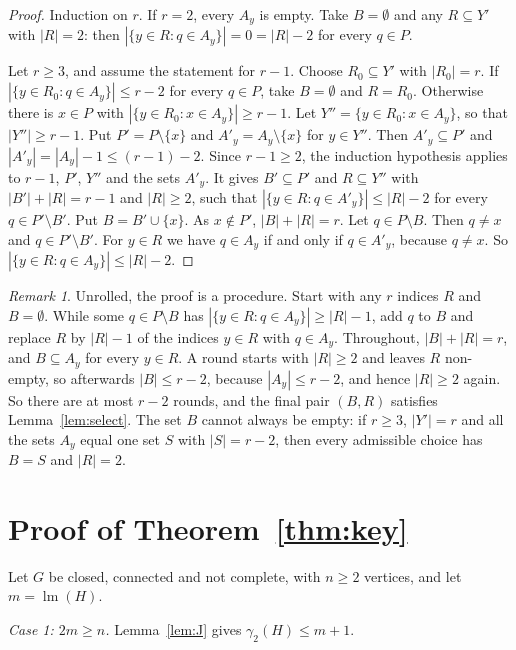 \documentclass[11pt,a4paper]{article}
\theoremstyle{remark}
\newtheorem{remark}[theorem]{Remark}
\newcommand{\lm}{\operatorname{lm}}
\begin{document}
\begin{proof}
Induction on $r$. If $r=2$, every $A_y$ is empty. Take $B=\emptyset$ and any $R\subseteq Y'$
with $|R|=2$: then $|\{y\in R: q\in A_y\}|=0=|R|-2$ for every $q\in P$.

Let $r\ge 3$, and assume the statement for $r-1$. Choose $R_0\subseteq Y'$ with $|R_0|=r$. If
$|\{y\in R_0: q\in A_y\}|\le r-2$ for every $q\in P$, take $B=\emptyset$ and $R=R_0$.
Otherwise there is $x\in P$ with $|\{y\in R_0: x\in A_y\}|\ge r-1$. Let
$Y''=\{y\in R_0: x\in A_y\}$, so that $|Y''|\ge r-1$. Put $P'=P\setminus\{x\}$ and
$A'_y=A_y\setminus\{x\}$ for $y\in Y''$. Then $A'_y\subseteq P'$ and
$|A'_y|=|A_y|-1\le(r-1)-2$. Since $r-1\ge 2$, the induction hypothesis applies to
$r-1$, $P'$, $Y''$ and the sets $A'_y$. It gives $B'\subseteq P'$ and $R\subseteq Y''$ with
$|B'|+|R|=r-1$ and $|R|\ge 2$, such that $|\{y\in R: q\in A'_y\}|\le|R|-2$ for every
$q\in P'\setminus B'$. Put $B=B'\cup\{x\}$. As $x\notin P'$, $|B|+|R|=r$. Let
$q\in P\setminus B$. Then $q\neq x$ and $q\in P'\setminus B'$. For $y\in R$ we have $q\in A_y$ if
and only if $q\in A'_y$, because $q\ne x$. So $|\{y\in R: q\in A_y\}|\le|R|-2$.
\end{proof}

\begin{remark}\label{rem:procedure}
Unrolled, the proof is a procedure. Start with any $r$ indices $R$ and $B=\emptyset$. While some
$q\in P\setminus B$ has $|\{y\in R: q\in A_y\}|\ge|R|-1$, add $q$ to $B$ and replace $R$ by
$|R|-1$ of the indices $y\in R$ with $q\in A_y$. Throughout, $|B|+|R|=r$, and $B\subseteq A_y$
for every $y\in R$. A round starts with $|R|\ge 2$ and leaves $R$ non-empty, so afterwards
$|B|\le r-2$, because $|A_y|\le r-2$, and hence $|R|\ge 2$ again. So there are at most $r-2$
rounds, and the final pair $(B,R)$ satisfies Lemma~\ref{lem:select}. The set $B$ cannot always
be empty: if $r\ge 3$, $|Y'|=r$ and all the sets $A_y$ equal one set $S$ with $|S|=r-2$, then every
admissible choice has $B=S$ and $|R|=2$.
\end{remark}

\section{Proof of Theorem~\ref{thm:key}}\label{sec:proofkey}

Let $G$ be closed, connected and not complete, with $n\ge 2$ vertices, and let $m=\lm(H)$.

\emph{Case 1: $2m\ge n$.} Lemma~\ref{lem:J} gives $\gamma_2(H)\le m+1$.
\end{document}
